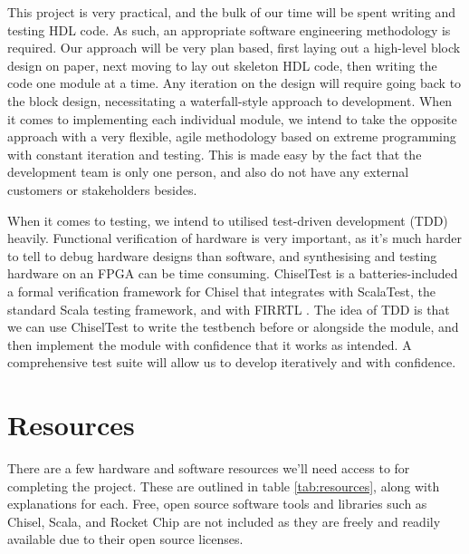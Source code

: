 \documentclass[a4paper,fleqn,12pt]{article}
\begin{document}
This project is very practical, and the bulk of our time will be spent writing and testing HDL code. As such, an appropriate software engineering methodology is required. Our approach will be very plan based, first laying out a high-level block design on paper, next moving to lay out skeleton HDL code, then writing the code one module at a time. Any iteration on the design will require going back to the block design, necessitating a waterfall-style approach to development. When it comes to implementing each individual module, we intend to take the opposite approach with a very flexible, agile methodology based on extreme programming with constant iteration and testing. This is made easy by the fact that the development team is only one person, and also do not have any external customers or stakeholders besides.

When it comes to testing, we intend to utilised test-driven development (TDD) heavily. Functional verification of hardware is very important, as it's much harder to tell to debug hardware designs than software, and synthesising and testing hardware on an FPGA can be time consuming. ChiselTest is a batteries-included a formal verification framework for Chisel that integrates with ScalaTest, the standard Scala testing framework, and with FIRRTL \citep{chiselverification}. The idea of TDD is that we can use ChiselTest to write the testbench before or alongside the module, and then implement the module with confidence that it works as intended. A comprehensive test suite will allow us to develop iteratively and with confidence.


\section{Resources}
There are a few hardware and software resources we'll need access to for completing the project. These are outlined in table \ref{tab:resources}, along with explanations for each. Free, open source software tools and libraries such as Chisel, Scala, and Rocket Chip are not included as they are freely and readily available due to their open source licenses.
\end{document}
